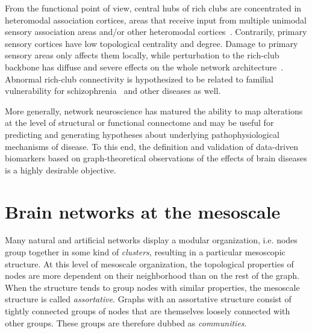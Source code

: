From the functional point of view, central hubs of rich clubs are concentrated in heteromodal association cortices, areas that receive input from multiple unimodal sensory association areas and/or other heteromodal cortices~\cite{sporns2007,power2013,kandel2013}.
Contrarily, primary sensory cortices have low topological centrality and degree. Damage to primary sensory areas only affects them locally, while perturbation to the rich-club backbone has diffuse and severe effects on the whole network architecture~\cite{honey2008,ball2014}.
Abnormal rich-club connectivity is hypothesized to be related to familial vulnerability for schizophrenia~\cite{collin2014impaired} and other diseases as well.

More generally, network neuroscience has matured the ability to map alterations at the level of structural or functional connectome and may be useful for predicting and generating hypotheses about underlying pathophysiological mechanisms of disease.
To this end, the definition and validation of data-driven biomarkers based on graph-theoretical observations of the effects of brain diseases is a highly desirable objective.

\section{Brain networks at the mesoscale}
Many natural and artificial networks display a modular organization, i.e. nodes group together in some kind of \emph{clusters}, resulting in a particular mesoscopic structure.
At this level of mesoscale organization, the topological properties of nodes are more dependent on their neighborhood than on the rest of the graph.
When the structure tends to group nodes with similar properties, the mesoscale structure is called \emph{assortative}.
Graphs with an assortative structure consist of tightly connected groups of nodes that are themselves loosely connected with other groups.
These groups are therefore dubbed as \emph{communities}.

